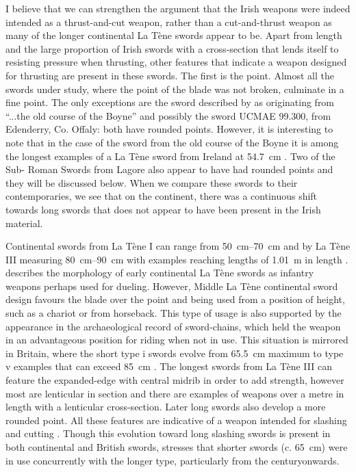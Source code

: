 I believe that we can strengthen the argument that the Irish weapons were indeed intended as a thrust-and-cut weapon, 
rather than a cut-and-thrust weapon as many of the longer continental La Tène swords appear to be. 
Apart from length and the large proportion of Irish swords with a cross-section that lends itself to resisting pressure when thrusting, 
other features that indicate a weapon designed for thrusting are present in these swords. 
The first is the point. 
Almost all the swords under study, where the point of the blade was not broken, culminate in a fine point. 
The only exceptions are the sword described by \textcite[92]{Hencken1950} as originating from “...the old course of the Boyne”  and possibly the sword UCMAE 99.300, from Edenderry, Co. Offaly: both have rounded points. 
However, it is interesting to note that in the case of the sword from the old course of the Boyne it is among the longest examples of a La Tène sword from Ireland at \SI{54.7}{\cm} \parencites[92]{Hencken1950}[93]{Rynne1982}[91]{Raftery1983}. 
Two of the Sub- Roman Swords from Lagore also appear to have had rounded points and they will be discussed below.
When we compare these swords to their contemporaries, we see that on the continent, there was a continuous shift towards long swords that does not appear to have been present in the Irish material. 

Continental swords from La Tène I can range from \SIrange{50}{70}{\cm} and by La Tène III measuring \SIrange{80}{90}{\cm} with examples reaching lengths of \SI{1.01}{\meter} in length \parencites{Pleiner1993}[84, 264, 272, 293, 296]{Stead2006a}[159--161]{Lejars2007}. 
\textcite[50\psq]{Brunaux2004} describes the morphology of early continental La Tène swords as infantry weapons perhaps used for dueling. 
However, Middle La Tène continental sword design favours the blade over the point and being used from a position of height, such as a chariot or from horseback. 
This type of usage is also supported by the appearance in the archaeological record of sword-chains, which held the weapon in an advantageous position for riding when not in use.
This situation is mirrored in Britain, where the short type i swords evolve from \SI{65.5}{\cm} maximum to type v examples that can exceed \SI{85}{\cm} \parencite[8\psq]{Stead2006}. 
The longest swords from La Tène III can feature the expanded-edge with central midrib in order to add strength, however most are lenticular in section and there are examples of weapons over a metre in length with a lenticular cross-section. Later long swords also develop a more rounded point. 
All these features are indicative of a weapon intended for slashing and cutting \parencites[8]{Stead2006}[160]{Lejars2007}. 
Though this evolution toward long slashing swords is present in both continental and British swords, \textcite[160]{Lejars2007} stresses that shorter swords (c. \SI{65}{\cm}) were in use concurrently with the longer type, particularly from the  century\BC onwards. 

